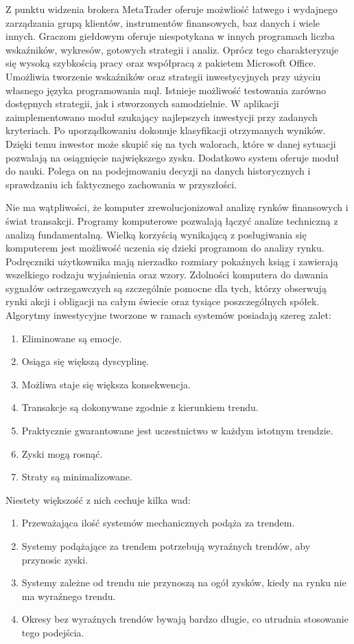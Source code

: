 \documentclass[pdflatex,11pt]{aghdpl}
\begin{document}
Z punktu widzenia brokera MetaTrader oferuje możwliość łatwego i wydajnego zarządzania grupą klientów, instrumentów finansowych, baz danych i wiele innych. Graczom giełdowym oferuje niespotykana w innych programach liczba wskaźników, wykresów, gotowych strategii i analiz. Oprócz tego charakteryzuje się wysoką szybkością pracy oraz współpracą z pakietem Microsoft Office. Umożliwia tworzenie wskaźników oraz strategii inwestycyjnych przy użyciu własnego języka programowania mql. Istnieje możliwość testowania zarówno dostępnych strategii, jak i stworzonych samodzielnie. W aplikacji zaimplementowano moduł szukający najlepszych inwestycji przy zadanych kryteriach. Po uporządkowaniu dokonuje klasyfikacji otrzymanych wyników. Dzięki temu inwestor może skupić się na tych walorach, które w danej sytuacji pozwalają na osiągnięcie największego zysku. Dodatkowo system oferuje moduł do nauki. Polega on na podejmowaniu decyzji na danych historycznych i sprawdzaniu ich faktycznego zachowania w przyszłości.

Nie ma wątpliwości, że komputer zrewolucjonizował analizę rynków finansowych i świat transakcji. Programy komputerowe pozwalają łączyć analize techniczną z analizą fundamentalną. Wielką korzyścią wynikającą z posługiwania się komputerem jest możliwość uczenia się dzieki programom do analizy rynku. Podręczniki użytkownika mają nierzadko rozmiary pokaźnych ksiąg i zawierają wszelkiego rodzaju wyjaśnienia oraz wzory. Zdolności komputera do dawania sygnałów ostrzegawczych są szczególnie pomocne dla tych, którzy obserwują rynki akcji i obligacji na całym świecie oraz tysiące poszczególnych spółek. Algorytmy inwestycyjne tworzone w ramach systemów posiadają szereg zalet:
\begin{enumerate}
\item Eliminowane są emocje.
\item Osiąga się większą dyscyplinę.
\item Możliwa staje się większa konsekwencja.
\item Transakcje są dokonywane zgodnie z kierunkiem trendu.
\item Praktycznie gwarantowane jest uczestnictwo w każdym istotnym trendzie.
\item Zyski mogą rosnąć.
\item Straty są minimalizowane.
\end{enumerate}

Niestety większość z nich cechuje kilka wad:
\begin{enumerate}
\item Przeważająca ilość systemów mechanicznych podąża za trendem.
\item Systemy podążające za trendem potrzebują wyraźnych trendów, aby przynosic zyski.
\item Systemy zależne od trendu nie przynoszą na ogół zysków, kiedy na rynku nie ma wyraźnego trendu.
\item Okresy bez wyraźnych trendów bywają bardzo długie, co utrudnia stosowanie tego podejścia.
\end{enumerate}
\end{document}
